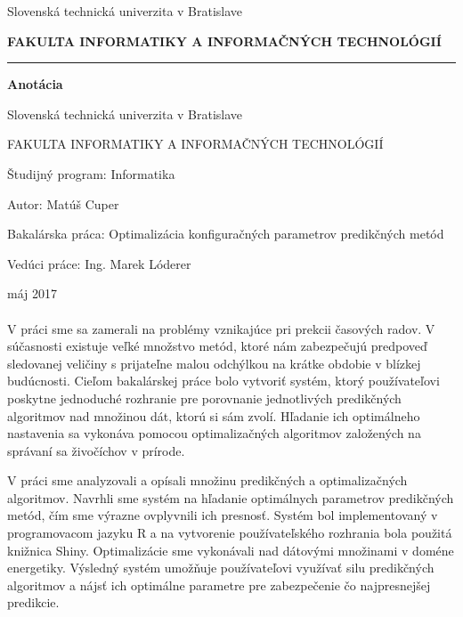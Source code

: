\documentclass[a4paper,slovak,12pt,appendix]{article}
\begin{document}


\begin{titlepage}
\begin{center}
  {\small Slovenská technická univerzita v Bratislave \par}
  {\small \textbf{FAKULTA INFORMATIKY A INFORMAČNÝCH TECHNOLÓGIÍ}}
  \rule{\textwidth}{1pt}

  \vspace*{1.5cm}
  \begin{Large}
    \textbf{Anotácia} \par
  \end{Large}
\end{center}
{Slovenská technická univerzita v Bratislave \par}
{FAKULTA INFORMATIKY A INFORMAČNÝCH TECHNOLÓGIÍ \par}
{Študijný program: Informatika \par}
{Autor: Matúš Cuper \par}
{Bakalárska práca: Optimalizácia konfiguračných parametrov predikčných metód \par}
{Vedúci práce: Ing. Marek Lóderer \par}
{máj 2017 \\} \\
V práci sme sa zamerali na problémy vznikajúce pri prekcii časových radov.
V súčasnosti existuje veľké množstvo metód, ktoré nám zabezpečujú predpoveď
sledovanej veličiny s prijateľne malou odchýlkou na krátke obdobie v blízkej
budúcnosti. Cieľom bakalárskej práce bolo vytvoriť systém, ktorý používateľovi
poskytne jednoduché rozhranie pre porovnanie jednotlivých predikčných
algoritmov nad množinou dát, ktorú si sám zvolí. Hľadanie ich optimálneho
nastavenia sa vykonáva pomocou optimalizačných algoritmov založených na
správaní sa živočíchov v prírode.

V práci sme analyzovali a opísali množinu predikčných a optimalizačných
algoritmov. Navrhli sme systém na hľadanie optimálnych parametrov predikčných
metód, čím sme výrazne ovplyvnili ich presnosť. Systém bol implementovaný
v programovacom jazyku R a na vytvorenie používateľského rozhrania bola použitá
knižnica Shiny. Optimalizácie sme vykonávali nad dátovými množinami v doméne
energetiky. Výsledný systém umožňuje používateľovi využívať silu predikčných
algoritmov a nájsť ich optimálne parametre pre zabezpečenie čo najpresnejšej
predikcie.
\end{titlepage}
\end{document}
